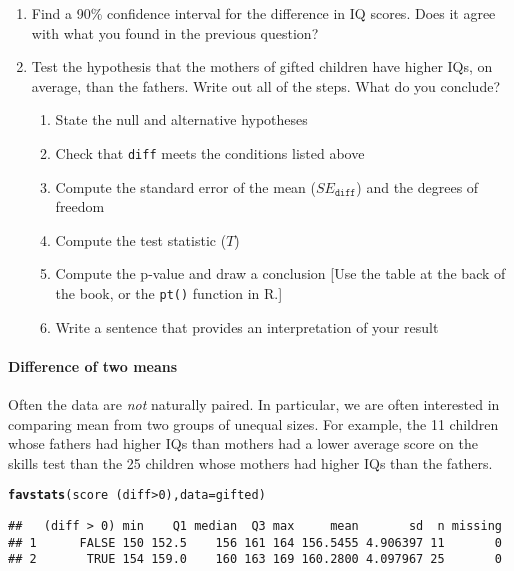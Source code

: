 \documentclass[10pt]{article}\usepackage[]{graphicx}\usepackage[]{color}
\makeatletter
\newcommand{\hlnum}[1]{\textcolor[rgb]{0.686,0.059,0.569}{#1}}%
\newcommand{\hlopt}[1]{\textcolor[rgb]{0,0,0}{#1}}%
\newcommand{\hlstd}[1]{\textcolor[rgb]{0.345,0.345,0.345}{#1}}%
\newcommand{\hlkwc}[1]{\textcolor[rgb]{0.333,0.667,0.333}{#1}}%
\newcommand{\hlkwd}[1]{\textcolor[rgb]{0.737,0.353,0.396}{\textbf{#1}}}%
\newenvironment{kframe}{%
 \def\at@end@of@kframe{}%
 \ifinner\ifhmode%
  \def\at@end@of@kframe{\end{minipage}}%
  \begin{minipage}{\columnwidth}%
 \fi\fi%
 \def\FrameCommand##1{\hskip\@totalleftmargin \hskip-\fboxsep
 \colorbox{shadecolor}{##1}\hskip-\fboxsep
     \hskip-\linewidth \hskip-\@totalleftmargin \hskip\columnwidth}%
 \MakeFramed {\advance\hsize-\width
   \@totalleftmargin\z@ \linewidth\hsize
   \@setminipage}}%
 {\par\unskip\endMakeFramed%
 \at@end@of@kframe}
\newenvironment{knitrout}{}{} %
\newcommand{\R}{{\sf R}\xspace}
\newcommand{\cmd}[1]{\texttt{#1}}
\makeatother
\begin{document}
\begin{enumerate}
\itemsep0.5in
\item Find a 90\% confidence interval for the difference in IQ scores. Does it agree with what you found in the previous question?
\item Test the hypothesis that the mothers of gifted children have higher IQs, on average, than the fathers. Write out all of the steps. What do you conclude?
\begin{enumerate}
    \itemsep0.5in
    \item State the null and alternative hypotheses
    \item Check that \texttt{diff} meets the conditions listed above
    \item Compute the standard error of the mean ($SE_{\texttt{diff}}$) and the degrees of freedom
    \item Compute the test statistic ($T$)
    \item Compute the p-value and draw a conclusion [Use the table at the back of the book, or the \cmd{pt()} function in \R.]
    \item Write a sentence that provides an interpretation of your result
  \end{enumerate}
\vspace{0.5in}
\end{enumerate}
  






\paragraph{Difference of two means}

Often the data are \emph{not} naturally paired. In particular, we are often interested in comparing mean from two groups of unequal sizes. For example, the 11 children whose fathers had higher IQs than mothers had a lower average score on the skills test than the 25 children whose mothers had higher IQs than the fathers. 

\begin{knitrout}\footnotesize
{}\color{fgcolor}\begin{kframe}
\begin{alltt}
\hlkwd{favstats}\hlstd{(score} \hlopt{~} \hlstd{(diff} \hlopt{>} \hlnum{0}\hlstd{),} \hlkwc{data} \hlstd{= gifted)}
\end{alltt}
\begin{verbatim}
##   (diff > 0) min    Q1 median  Q3 max     mean       sd  n missing
## 1      FALSE 150 152.5    156 161 164 156.5455 4.906397 11       0
## 2       TRUE 154 159.0    160 163 169 160.2800 4.097967 25       0
\end{verbatim}
\end{kframe}
\end{knitrout}
\end{document}
